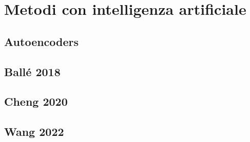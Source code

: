 \chapter{Metodi con intelligenza artificiale}

\section{Autoencoders}

\section{Ballé 2018}

\section{Cheng 2020}

\section{Wang 2022}


